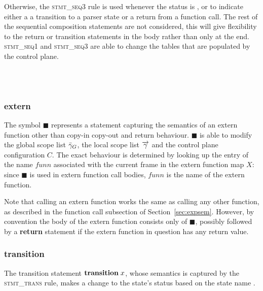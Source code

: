 \documentclass[UTF8]{article}
\begin{document}
Otherwise, the \textsc{stmt\_seq3}  rule is used whenever the status is \returnst{}, or \trans{} to indicate either a a transition to a parser state or a return from a function call. The rest of the sequential composition statements are not considered, this will give flexibility to the return or transition statements in the body rather than only at the end.
\textsc{stmt\_seq1} and \textsc{stmt\_seq3} are able to change the tables that are populated by the control plane.

\begin{figure}[h!]
    \ottusedrule{\ottdrulestmtXXseqOne{}} \\
    \ottusedrule{\ottdrulestmtXXseqTwo{}} \\
    \ottusedrule{\ottdrulestmtXXseqThree{}}
\end{figure}


\subsubsection*{extern}
The symbol $\blacksquare$ represents a statement capturing the semantics of an extern function other than copy-in copy-out and return behaviour. $\blacksquare$ is able to modify the global scope list $\bar{\gamma}_G$, the local scope list $\overrightarrow{\gamma}$ and the control plane configuration $C$. The exact behaviour is determined by looking up the entry of the name $\mathit{funn}$ associated with the current frame in the extern function map $X$: since $\blacksquare$ is used in extern function call bodies, $\mathit{funn}$ is the name of the extern function.

Note that calling an extern function works the same as calling any other function, as described in the function call subsection of Section~\ref{sec:expsem}. However, by convention the body of the extern function consists only of $\blacksquare$, possibly followed by a \textbf{return} statement if the extern function in question has any return value.

\begin{figure}[ht!]
    \ottusedrule{\ottdrulestmtXXext{}}
\end{figure}

\subsubsection*{transition}
The transition statement $\mathbf{transition} \; x $, whose semantics is captured by the \textsc{stmt\_trans} rule, makes a change to the state's status \status{} based on the state name \vn{}.
\end{document}
